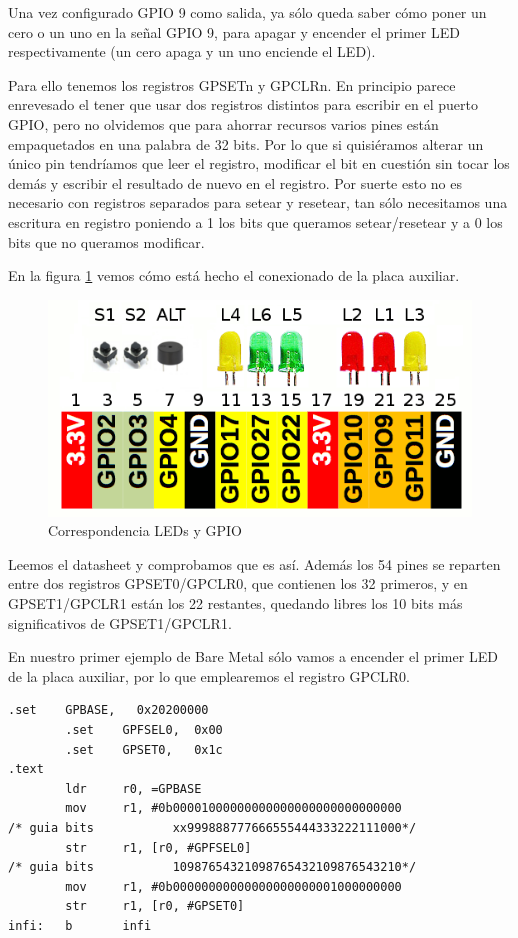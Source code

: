 Una vez configurado GPIO 9 como salida, ya sólo queda saber cómo poner un cero o un
uno en la señal GPIO 9, para apagar y encender el primer LED respectivamente (un cero apaga
y un uno enciende el LED).

Para ello tenemos los registros GPSETn y GPCLRn. En principio parece enrevesado el tener
que usar dos registros distintos para escribir en el puerto GPIO, pero no olvidemos que
para ahorrar recursos varios pines están empaquetados en una palabra de 32 bits. Por lo
que si quisiéramos alterar un único pin tendríamos que leer el registro, modificar el bit
en cuestión sin tocar los demás y escribir el resultado de nuevo en el registro. Por suerte
esto no es necesario con registros separados para setear y resetear, tan sólo necesitamos
una escritura en registro poniendo a 1 los bits que queramos setear/resetear y a 0 los bits
que no queramos modificar.

En la figura \ref{fig:pinout} vemos cómo está hecho el conexionado de la placa auxiliar.

\begin{figure}[h]
  \centering
    \includegraphics[width=14cm]{graphs/RaspberryGPIOaux.png}
  \caption{Correspondencia LEDs y GPIO}
  \label{fig:pinout}
\end{figure}

Leemos el datasheet y comprobamos que es así. Además los 54 pines se reparten entre dos
registros GPSET0/GPCLR0, que contienen los 32 primeros, y en GPSET1/GPCLR1 están los 22
restantes, quedando libres los 10 bits más significativos de GPSET1/GPCLR1.

En nuestro
primer ejemplo de Bare Metal sólo vamos a encender el primer LED de la placa auxiliar,
por lo que emplearemos el registro GPCLR0.

\begin{lstlisting}[caption={esbn2.s},label={lst:codigoPract4_2}]
        .set    GPBASE,   0x20200000
        .set    GPFSEL0,  0x00
        .set    GPSET0,   0x1c
.text
        ldr     r0, =GPBASE
        mov     r1, #0b00001000000000000000000000000000
/* guia bits           xx999888777666555444333222111000*/
        str     r1, [r0, #GPFSEL0]
/* guia bits           10987654321098765432109876543210*/
        mov     r1, #0b00000000000000000000001000000000
        str     r1, [r0, #GPSET0]
infi:   b       infi
\end{lstlisting}

